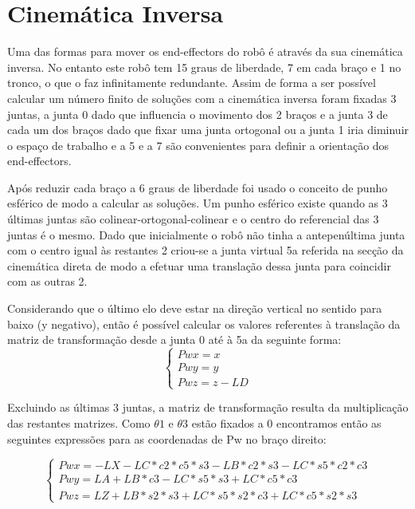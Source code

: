\documentclass{report}
\begin{document}
\section{Cinemática Inversa}

Uma das formas para mover os end-effectors do robô é através da sua cinemática inversa. No entanto este robô tem 15 graus de liberdade, 7 em cada braço e 1 no tronco, o que o faz infinitamente redundante. Assim de forma a ser possível calcular um número finito de soluções com a cinemática inversa foram fixadas 3 juntas, a junta 0 dado que influencia o movimento dos 2 braços e a junta 3 de cada um dos braços dado que fixar uma junta ortogonal ou a junta 1 iria diminuir o espaço de trabalho e a 5 e a 7 são convenientes para definir a orientação dos end-effectors.

Após reduzir cada braço a 6 graus de liberdade foi usado o conceito de punho esférico de modo a calcular as soluções. Um punho esférico existe quando as 3 últimas juntas são colinear-ortogonal-colinear e o centro do referencial das 3 juntas é o mesmo. Dado que inicialmente o robô não tinha a antepenúltima junta com o centro igual às restantes 2 criou-se a junta virtual 5a referida na secção da cinemática direta de modo a efetuar uma translação dessa junta para coincidir com as outras 2.

Considerando que o último elo deve estar na direção vertical no sentido para baixo (y negativo), então é possível calcular os valores referentes à translação da matriz de transformação desde a junta 0 até à 5a da seguinte forma:
\begin{equation}
    \begin{cases}
      Pwx = x\\
      Pwy = y\\
      Pwz = z - LD
    \end{cases}
\end{equation}

Excluindo as últimas 3 juntas, a matriz de transformação resulta da multiplicação das restantes matrizes. Como $\theta 1$ e $\theta 3$ estão fixados a 0 encontramos então as seguintes expressões para as coordenadas de Pw no braço direito:

\begin{equation}
    \begin{cases}
      Pwx = -LX -LC*c2*c5*s3 - LB*c2*s3 - LC*s5*c2*c3\\
      Pwy = LA + LB*c3 - LC*s5*s3 + LC*c5*c3\\
      Pwz = LZ + LB*s2*s3 + LC*s5*s2*c3 + LC*c5*s2*s3
     \end{cases}
\end{equation}
\end{document}
